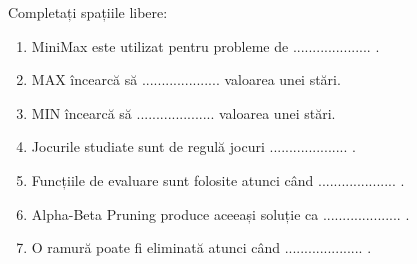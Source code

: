 \documentclass[12pt,a4paper]{article}
\begin{document}
Completați spațiile libere:

\begin{enumerate}
\item MiniMax este utilizat pentru probleme de .................... .
\item MAX încearcă să .................... valoarea unei stări.
\item MIN încearcă să .................... valoarea unei stări.
\item Jocurile studiate sunt de regulă jocuri  .................... .
\item Funcțiile de evaluare sunt folosite atunci când .................... .
\item Alpha-Beta Pruning produce aceeași soluție ca .................... .
\item O ramură poate fi eliminată atunci când .................... .
\end{enumerate}
\end{document}
